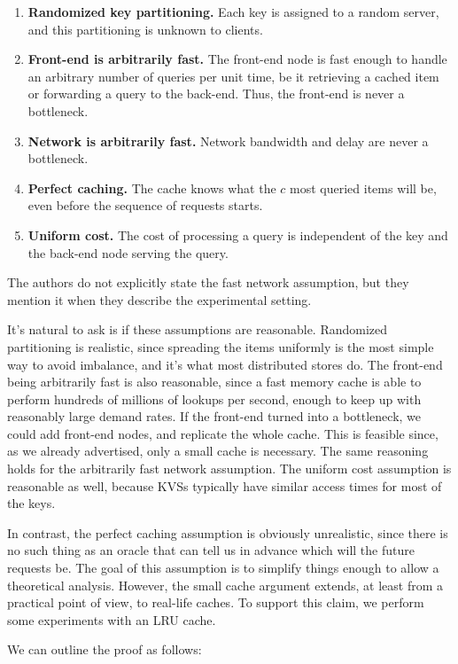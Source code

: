 \documentclass[10pt,letterpaper]{article}
\begin{document}
\begin{enumerate}
	\item \textbf{Randomized key partitioning.} Each key is assigned to a random server, and this partitioning is unknown to clients.
	\item \textbf{Front-end is arbitrarily fast.} The front-end node is fast enough to handle an arbitrary number of queries per unit time, be it retrieving a cached item or forwarding a query to the back-end. Thus, the front-end is never a bottleneck.
	\item \textbf{Network is arbitrarily fast.} Network bandwidth and delay are never a bottleneck.
	\item \textbf{Perfect caching.} The cache knows what the $c$ most queried items will be, even before the sequence of requests starts.
	\item \textbf{Uniform cost.} The cost of processing a query is independent of the key and the back-end node serving the query.
\end{enumerate}

\noindent
The authors do not explicitly state the fast network assumption, but they mention it when they describe the experimental setting.

It's natural to ask is if these assumptions are reasonable. Randomized partitioning is realistic, since spreading the items uniformly is the most simple way to avoid imbalance, and it's what most distributed stores do. The front-end being arbitrarily fast is also reasonable, since a fast memory cache is able to perform hundreds of millions of lookups per second, enough to keep up with reasonably large demand rates. If the front-end turned into a bottleneck, we could add front-end nodes, and replicate the whole cache. This is feasible since, as we already advertised, only a small cache is necessary. The same reasoning holds for the arbitrarily fast network assumption. The uniform cost assumption is reasonable as well, because KVSs typically have similar access times for most of the keys.

In contrast, the perfect caching assumption is obviously unrealistic, since there is no such thing as an oracle that can tell us in advance which will the future requests be. The goal of this assumption is to simplify things enough to allow a theoretical analysis. However, the small cache argument extends, at least from a practical point of view, to real-life caches. To support this claim, we perform some experiments with an LRU cache.

We can outline the proof as follows:
\end{document}
